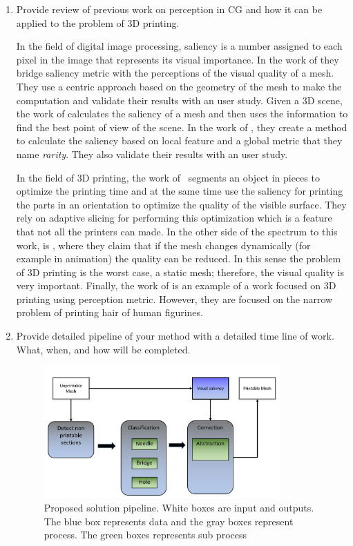 \begin{enumerate}
  \item Provide review of previous work on perception in CG and how it can be applied to the problem of 3D printing.
	
	In the field of digital image processing, saliency is a number assigned to each pixel in the image that represents its visual importance. In the work of \cite{Kim2010} they bridge saliency metric with the perceptions of the visual quality of a mesh. They use a centric approach based on the geometry of the mesh to make the computation and validate their results with an user study. Given a 3D scene, the work of \cite{Feixas2009} calculates the saliency of a mesh and then uses the information to find the best point of view of the scene. In the work of \cite{Wu2013}, they create a method to calculate the saliency based on local feature and a global metric that they name \emph{rarity}. They also validate their results with an user study.
	
	In the field of 3D printing, the work of~\cite{Wang2015} segments an object in pieces to optimize the printing time and at the same time use the saliency for printing the parts in an orientation to optimize the quality of the visible surface. They rely on adaptive slicing for performing this optimization which is a feature that not all the printers can made. In the other side of the spectrum to this work, is \cite{Torkhani2015}, where they claim that if the mesh changes dynamically (for example in animation) the quality can be reduced. In this sense the problem of 3D printing is the worst case, a static mesh; therefore, the visual quality is very important. Finally, the work of \cite{Echevarria2014} is an example of a work focused on 3D printing using perception metric. However, they are focused on the narrow problem of printing hair of human figurines.
	
  \item Provide detailed pipeline of your method with a detailed time line of work. What, when, and how will be completed.
	
	\begin{figure}[htp]
		\centering
    \includegraphics[width=0.85\textwidth]{img/Pipeline2}
		\caption{Proposed solution pipeline. White boxes are input and outputs. The blue box represents data and the gray boxes represent process. The green boxes represents sub process}
		\label{fig:pipeline}
	\end{figure}
	

\end{enumerate}

